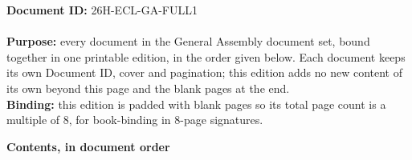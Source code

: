 \documentclass{../../Common/Latex/Templates/rapport}
\date{\meetingdate, \meetingtime}
\begin{document}
\makecoverpage
\reportmainmatter
\pagestyle{fullcounter}

\noindent\textbf{Document ID:} 26H-ECL-GA-FULL1\\
\meetingline\\
\textbf{Purpose:} every document in the General Assembly document set, bound together in one printable edition, in the order given below. Each document keeps its own Document ID, cover and pagination; this edition adds no new content of its own beyond this page and the blank pages at the end.\\
\textbf{Binding:} this edition is padded with blank pages so its total page count is a multiple of 8, for book-binding in 8-page signatures.

\vspace{0.6em}
\textbf{Contents, in document order}
\end{document}

